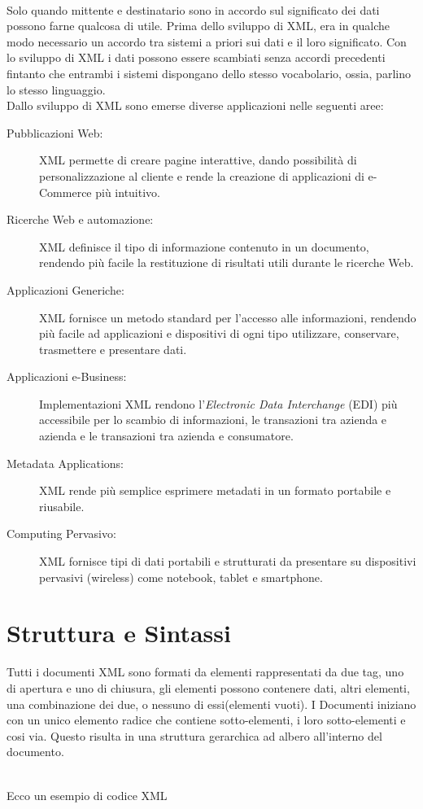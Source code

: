 \\
Solo quando mittente e destinatario sono in accordo sul significato dei dati possono farne qualcosa di utile. Prima dello sviluppo di XML,
era in qualche modo necessario un accordo tra sistemi a priori sui dati e il loro significato. Con lo sviluppo di XML i dati possono essere scambiati senza accordi precedenti fintanto che entrambi i sistemi dispongano dello stesso vocabolario, ossia, parlino lo stesso linguaggio.
\\
Dallo sviluppo di XML sono emerse diverse applicazioni nelle seguenti aree:
\begin{description}
\item[Pubblicazioni Web:] XML permette di creare pagine interattive, dando possibilità di personalizzazione al cliente e rende la creazione di applicazioni di e-Commerce più intuitivo.
\item[Ricerche Web e automazione:] XML definisce il tipo di  informazione contenuto in un documento, rendendo più facile la restituzione di risultati utili durante le ricerche Web.
\item[Applicazioni Generiche:] XML fornisce un metodo standard per l'accesso alle informazioni, rendendo più facile ad applicazioni e dispositivi di ogni tipo  utilizzare, conservare, trasmettere e presentare dati.
\item[Applicazioni e-Business:] Implementazioni XML rendono l'\emph{Electronic Data Interchange} (EDI) più accessibile per lo scambio di informazioni, le transazioni tra azienda e azienda e le transazioni tra azienda e consumatore.
\item[Metadata Applications:] XML rende più semplice esprimere metadati in un formato portabile e riusabile.
\item[Computing Pervasivo:] XML fornisce tipi di dati portabili e strutturati da presentare su dispositivi pervasivi (wireless) come notebook, tablet e smartphone.
\end{description}
\section{Struttura e Sintassi}
Tutti i documenti XML sono formati da elementi rappresentati da due tag, uno di apertura e uno di chiusura, gli elementi possono contenere dati, altri elementi, una combinazione dei due, o nessuno di essi(elementi vuoti). I Documenti iniziano con un unico elemento radice che contiene sotto-elementi, i loro sotto-elementi e cosi via. Questo risulta in una struttura gerarchica ad albero all'interno del documento.\\\\
\begin{flushleft}
\begin{example}
Ecco un esempio di codice XML\\
\inputminted[linenos,frame=lines]{xml}{esempio1.xml}
\label{lst:xml_example}
\end{example}
\end{flushleft}

